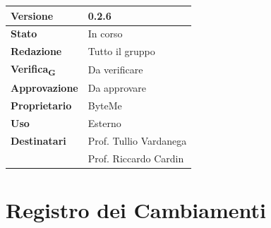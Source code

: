 \documentclass[11pt,a4paper]{article}
\newcommand{\gls}[1]{#1\textsubscript{G}}
\begin{document}
\begin{titlepage}
    \begin{table}[H]
        \centering
        \begin{tabular}{|l|p{5cm}|}
            \hline
            \textbf{Versione} & 0.2.6 \\
            \hline
            \textbf{Stato} & In corso \\
            \hline
            \textbf{Redazione} & Tutto il gruppo\\
            \hline
            \textbf{\gls{Verifica}} & Da verificare\\
            \hline
            \textbf{Approvazione} & Da approvare\\
            \hline
            \textbf{Proprietario} & ByteMe \\
            \hline
            \textbf{Uso} & Esterno \\
            \hline
            \textbf{Destinatari} & Prof. Tullio Vardanega \\ & Prof. Riccardo Cardin \\
            \hline
        \end{tabular}
    \end{table}
    
    \vfill
\end{titlepage}

\thispagestyle{empty}
\section*{Registro dei Cambiamenti}
\end{document}
